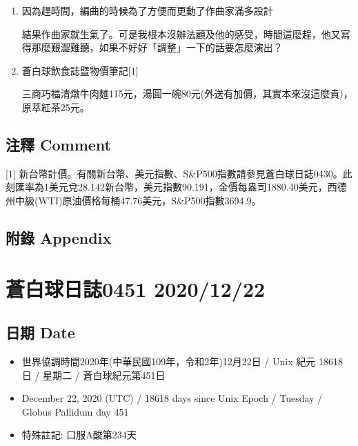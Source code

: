 \documentclass[a5paper, 10pt
]{book}
\providecommand{\tightlist}{%
  \setlength{\itemsep}{0pt}\setlength{\parskip}{0pt}}
\begin{document}
\begin{enumerate}
\def\labelenumi{\arabic{enumi}.}
\item
  因為趕時間，編曲的時候為了方便而更動了作曲家滿多設計

  結果作曲家就生氣了。可是我根本沒辦法顧及他的感受，時間這麼趕，他又寫得那麼艱澀難聽，如果不好好「調整」一下的話要怎麼演出？
\item
  蒼白球飲食誌暨物價筆記{[}1{]}

  三商巧福清燉牛肉麵115元，湯圓一碗80元(外送有加價，其實本來沒這麼貴)，原萃紅茶25元。
\end{enumerate}

\hypertarget{ux6ce8ux91cb-comment-20}{%
\subsection{注釋 Comment}\label{ux6ce8ux91cb-comment-20}}

{[}1{]}
新台幣計價。有關新台幣、美元指數、S\&P500指數請參見蒼白球日誌0430。此刻匯率為1美元兌28.142新台幣，美元指數90.191，金價每盎司1880.40美元，西德州中級(WTI)原油價格每桶47.76美元，S\&P500指數3694.9。

\hypertarget{ux9644ux9304-appendix-20}{%
\subsection{附錄 Appendix}\label{ux9644ux9304-appendix-20}}

\hypertarget{ux84bcux767dux7403ux65e5ux8a8c0451-20201222}{%
\section{蒼白球日誌0451
2020/12/22}\label{ux84bcux767dux7403ux65e5ux8a8c0451-20201222}}

\hypertarget{ux65e5ux671f-date-21}{%
\subsection{日期 Date}\label{ux65e5ux671f-date-21}}

\begin{itemize}
\tightlist
\item
  世界協調時間2020年(中華民國109年，令和2年)12月22日 / Unix 紀元 18618
  日 / 星期二 / 蒼白球紀元第451日
\item
  December 22, 2020 (UTC) / 18618 days since Unix Epoch / Tuesday /
  Globus Pallidum day 451
\item
  特殊註記: 口服A酸第234天
\end{itemize}
\end{document}
